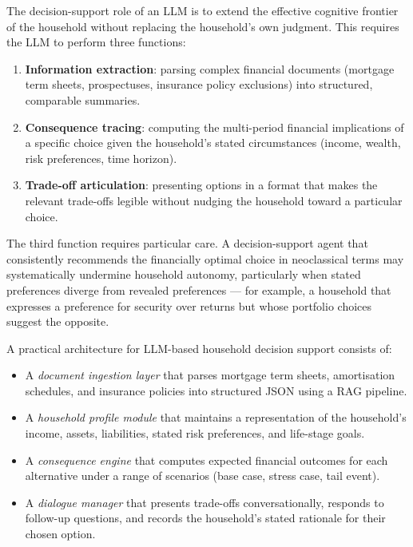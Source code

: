 \begin{context}
The decision-support role of an LLM is to extend the effective cognitive frontier of the household without replacing the household's own judgment. This requires the LLM to perform three functions:

\begin{enumerate}
  \item \textbf{Information extraction}: parsing complex financial documents (mortgage term sheets, prospectuses, insurance policy exclusions) into structured, comparable summaries.
  \item \textbf{Consequence tracing}: computing the multi-period financial implications of a specific choice given the household's stated circumstances (income, wealth, risk preferences, time horizon).
  \item \textbf{Trade-off articulation}: presenting options in a format that makes the relevant trade-offs legible without nudging the household toward a particular choice.
\end{enumerate}

The third function requires particular care. A decision-support agent that consistently recommends the financially optimal choice in neoclassical terms may systematically undermine household autonomy, particularly when stated preferences diverge from revealed preferences --- for example, a household that expresses a preference for security over returns but whose portfolio choices suggest the opposite.

A practical architecture for LLM-based household decision support consists of:
\begin{itemize}
  \item A \emph{document ingestion layer} that parses mortgage term sheets, amortisation schedules, and insurance policies into structured JSON using a RAG pipeline.
  \item A \emph{household profile module} that maintains a representation of the household's income, assets, liabilities, stated risk preferences, and life-stage goals.
  \item A \emph{consequence engine} that computes expected financial outcomes for each alternative under a range of scenarios (base case, stress case, tail event).
  \item A \emph{dialogue manager} that presents trade-offs conversationally, responds to follow-up questions, and records the household's stated rationale for their chosen option.
\end{itemize}


\end{context}
